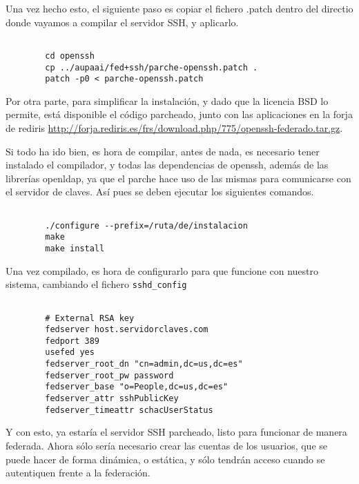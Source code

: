         Una vez hecho esto, el siguiente paso es copiar el fichero
        .patch dentro del directio donde vayamos a compilar el
        servidor SSH, y aplicarlo.

        \begin{verbatim}
        
        cd openssh
        cp ../aupaai/fed+ssh/parche-openssh.patch .
        patch -p0 < parche-openssh.patch

        \end{verbatim}

        Por otra parte, para simplificar la instalación, y dado que la
        licencia BSD lo permite, está disponible el código parcheado,
        junto con las aplicaciones en la forja de rediris
        \url{http://forja.rediris.es/frs/download.php/775/openssh-federado.tar.gz}.

        Si todo ha ido bien, es hora de compilar, antes de nada, es
        necesario tener instalado el compilador, y todas las
        dependencias de openssh, además de las librerías openldap, ya
        que el parche hace uso de las mismas para comunicarse con el
        servidor de claves. Así pues se deben ejecutar los siguientes
        comandos.

        \begin{verbatim}

        ./configure --prefix=/ruta/de/instalacion
        make
        make install

        \end{verbatim}

        Una vez compilado, es hora de configurarlo para que funcione
        con nuestro sistema, cambiando el fichero \texttt{sshd\_config}

        \begin{verbatim}

        # External RSA key
        fedserver host.servidorclaves.com
        fedport 389
        usefed yes
        fedserver_root_dn "cn=admin,dc=us,dc=es"
        fedserver_root_pw password
        fedserver_base "o=People,dc=us,dc=es"
        fedserver_attr sshPublicKey
        fedserver_timeattr schacUserStatus

        \end{verbatim}

        Y con esto, ya estaría el servidor SSH parcheado, listo para
        funcionar de manera federada. Ahora sólo sería necesario crear
        las cuentas de los usuarios, que se puede hacer de forma
        dinámica, o estática, y sólo tendrán acceso cuando se
        autentiquen frente a la federación.

